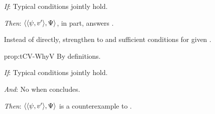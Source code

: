 \begin{note}
  \begin{proposition}
    \label{prop:tCV-WhyV}

    \begin{itenum}
    \item[\emph{If}:]
      Typical conditions jointly hold.
    \item[\emph{Then}:]
        \(\langle \langle \psi, v' \rangle, \Psi \rangle\), in part, answers \qWhyV{}.
    \end{itenum}
    \vspace{-\baselineskip}
  \end{proposition}

  Instead of \requ{} directly, strengthen to \tCV{} and sufficient conditions for \requ{} given \tCV{}.

  \begin{argument}{prop:tCV-WhyV}
    By definitions.
  \end{argument}

    \begin{proposition}
    \label{prop:tCV-WhyV-ces}

    \begin{itenum}
    \item[\emph{If}:]
      Typical conditions jointly hold.
    \item[\emph{And}:]
      No \wit{} when concludes.
    \item[\emph{Then}:]
      \(\langle \langle \psi, v' \rangle, \Psi \rangle\) is a counterexample to \issueConstraint{}.
    \end{itenum}
    \vspace{-\baselineskip}
  \end{proposition}
\end{note}


